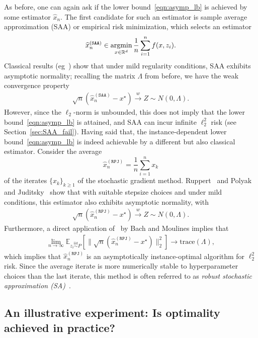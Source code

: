 \documentclass[11pt,twoside]{article}
\numberwithin{equation}{section}
\newcommand{\EE}{\mathbb{E}}
\newcommand{\trace}[1]{\mathrm{trace}\left(#1\right)}
\newcommand{\RR}{\mathbb{R}}
\newcommand{\1}{\mathbf{1}}
\newcommand{\argmin}{\operatornamewithlimits{argmin}}
\theoremstyle{remark}
\theoremstyle{plain}
\newcommand{\rpj}{\widehat x_n^{(\texttt{RPJ})}}
\newcommand{\saa}{\widehat x_n^{(\texttt{SAA})}}
\begin{document}
	As before, one can again ask if the lower bound~\eqref{eqn:asymp_lb} is achieved by some estimator $\widehat{x}_n$. The first candidate for such an estimator is sample average approximation (SAA) or empirical risk minimization, which selects an estimator
	\begin{align*}
	\saa \in \argmin_{x \in \RR^d} \frac{1}{n} \sum_{i=1}^{n} f(x, z_i).
	\end{align*} 
	Classical results (eg~\cite[Theorem 3.3]{shapiro1989asymptotic}) show that under mild regularity conditions, SAA exhibits asymptotic normality; recalling the matrix $\Lambda$ from before, we have the weak convergence property
\begin{align}\label{eqn:saa_normality}
	\sqrt{n} (\saa - x^\star) \overset{w}{\longrightarrow} Z \sim N(0,\Lambda).
	\end{align}
	However, since the $\ell_2$-norm is unbounded, this does not imply that the lower bound~\eqref{eqn:asymp_lb} is attained, and SAA can incur infinite $\ell_2^2$ risk (see Section~\ref{sec:SAA_fail}).  
    Having said that, the instance-dependent lower bound~\eqref{eqn:asymp_lb} is indeed achievable by a different but also classical estimator. Consider the average 
	$$\rpj = \frac{1}{n} \sum_{i=1}^{n}x_k$$ 
	of the iterates $\{ x_k \}_{k \geq 1}$ of the stochastic gradient method. Ruppert~\cite{ruppert1988efficient} and Polyak and Juditsky~\cite{polyak1992acceleration} show that with suitable stepsize choices and under mild conditions, this estimator also exhibits asymptotic normality, with
\begin{align}\label{eqn:rpj_normality}
\sqrt{n} (\rpj - x^\star) \overset{w}{\longrightarrow} Z \sim N(0,\Lambda).
\end{align}
	 Furthermore, a direct application of~\cite[Theorem 3]{moulines2011non} by Bach and Moulines implies that
	\begin{align}\label{eqn:upper_bound_RPJ}
	\lim_{n\rightarrow \infty}\EE_{z_i\overset{\mathrm{iid}}{\sim}  P}[\|\sqrt{n}(\rpj - x^\star)\|_2^2] \rightarrow \trace{\Lambda},
	\end{align}
	which implies that $\rpj$ is an asymptotically instance-optimal algorithm for $\ell_2^2$ risk. Since the average iterate is more numerically stable to hyperparameter choices than the last iterate, this method is often referred to as \emph{robust stochastic approximation (SA)}~\cite{nemirovski2009robust}.


    \subsection{An illustrative experiment: Is optimality achieved in practice? }
\end{document}
